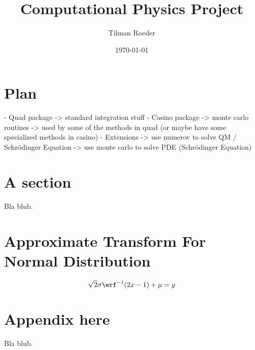 \documentclass[10pt, a4paper]{article}
\title{Computational Physics Project}
\author{Tilman Roeder}
\date{\today}
\begin{document}
\maketitle

\section{Plan}
- Quad package -> standard integration stuff
- Casino package -> monte carlo routines
  -> used by some of the methods in quad (or maybe have some specialized methods in casino)
- Extensions
  -> use numerov to solve QM / Schrödinger Equation
  -> use monte carlo to solve PDE (Schrödinger Equation)

\section{A section}
Bla blub.

\section{Approximate Transform For Normal Distribution}
\begin{equation}
\sqrt{2} \sigma \erf^{-1}(2x - 1) + \mu = y
\end{equation}

{}


\appendix{}

\section{Appendix here}
Bla blub.
\end{document}
